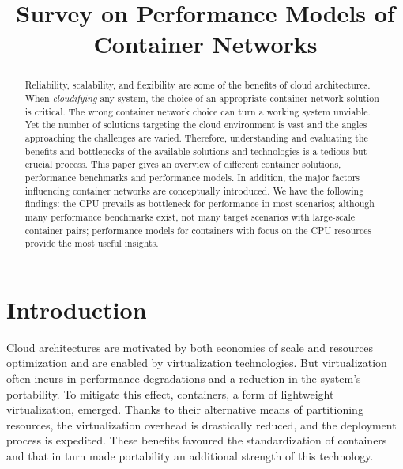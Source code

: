 \documentclass[conference]{IEEEtran}
\begin{document}
%
\title{Survey on Performance Models of Container Networks}


\author{
}

\maketitle

\begin{abstract}
Reliability, scalability, and flexibility are some of the benefits of cloud architectures.  When \textit{cloudifying} any system, the choice of an appropriate container network solution is critical. The wrong container network choice can turn a working system unviable. %
Yet the number of solutions targeting the cloud environment is vast and the angles approaching the challenges are varied. Therefore, understanding and evaluating the benefits and bottlenecks of the available solutions and technologies is a tedious but crucial process. This paper gives an overview of different container solutions, performance benchmarks and performance models. In addition, the major factors influencing container networks are conceptually introduced. We have the following findings: the CPU prevails as bottleneck for performance in most scenarios; although many performance benchmarks exist, not many target scenarios with large-scale container pairs; performance models for containers with focus on the CPU resources provide the most useful insights. 
\end{abstract}


\section{Introduction}
Cloud architectures are motivated by both economies of scale and resources optimization and are enabled by virtualization technologies. But virtualization often incurs in performance degradations and a reduction in the system's portability. To mitigate this effect, containers, a form of lightweight virtualization, emerged. Thanks to their alternative means of partitioning resources, the virtualization overhead is drastically reduced, and the deployment process is expedited. These benefits favoured the standardization of containers and that in turn made portability an additional strength of this technology.
\end{document}
